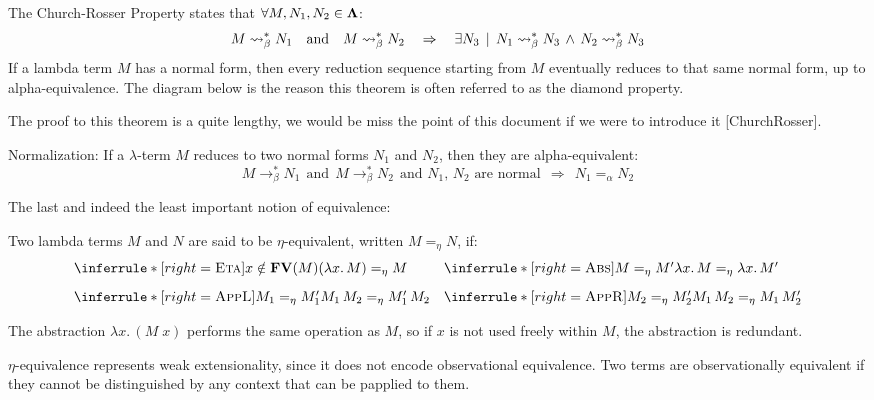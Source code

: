 \begin{theorem} The Church-Rosser Property states that $\forall M, N_1, N_2 \in \mathbf{\Lambda}$:
  \[
    M \mathrel{\leadsto}_\beta^* N_1 \quad \text{and} \quad M \mathrel{\leadsto}_\beta^* N_2 \quad \Rightarrow \quad \exists N_3 \, \mid \, N_1 \mathrel{\leadsto}_\beta^* N_3 \,\wedge\, N_2 \mathrel{\leadsto}_\beta^* N_3
  \]
  If a lambda term $M$ has a normal form, then every reduction sequence starting from $M$ eventually reduces to that same normal form, up to alpha-equivalence. The diagram below is the reason this theorem is often referred to as the diamond property.
\begin{center}
\end{center}
The proof to this theorem is a quite lengthy, we would be miss the point
of this document if we were to introduce it [ChurchRosser].
\end{theorem}
\begin{corollary} Normalization: If a $\lambda$-term $M$ reduces to two normal forms $N_1$ and $N_2$, then they are alpha-equivalent:
\[
M \to_\beta^* N_1 \ \ \text{and} \ \ M \to_\beta^* N_2 \ \ \text{and $N_1$, $N_2$ are normal} \ \ \Rightarrow \ \ N_1 =_\alpha N_2
\]
\end{corollary}
The last and indeed the least important notion of equivalence:
\begin{definition} Two lambda terms \( M \) and \( N \) are said to be $\eta$-equivalent, written \( M =_\eta N \), if:
  \[
\begin{array}{@{}l@{\quad}l@{}}
  \inferrule*[right=\textsc{Eta}]
  { x \notin \FV M }
  { (\lam{x}{M}) =_\eta M   }
  &
  \inferrule*[right=\textsc{Abs}]
    { M =_\eta M' }
    { \lam{x}{M} =_\eta \lam{x}{M'} } \\[2ex]
  \inferrule*[right=\textsc{AppL}]
    { M_1 =_\eta M_1' }
    { M_1\,M_2 =_\eta M_1'\,M_2 }
  &
  \inferrule*[right=\textsc{AppR}]
    { M_2 =_\eta M_2' }
    { M_1\,M_2 =_\eta M_1\,M_2' }
\end{array}
\]

  The abstraction \( \lambda x.\, (M\;x) \) performs the same operation as \( M \), so if \( x \) is not used freely within \( M \), the abstraction is redundant.
\end{definition}
$\eta$-equivalence represents weak extensionality, since it does not encode observational equivalence. Two terms are observationally equivalent if they cannot be distinguished by any context that can be papplied to them.
